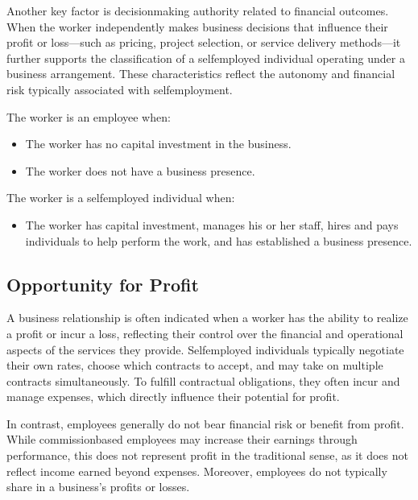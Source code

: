 \documentclass[letterpaper,10pt,english]{sphinxmanual}
\begin{document}
\sphinxAtStartPar
Another key factor is decision\sphinxhyphen{}making authority related to financial outcomes. When the worker independently makes business
decisions that influence their profit or loss—such as pricing, project selection, or service delivery methods—it further
supports the classification of a self\sphinxhyphen{}employed individual operating under a business arrangement. These characteristics
reflect the autonomy and financial risk typically associated with self\sphinxhyphen{}employment.

\sphinxAtStartPar
The worker is an employee when:
\begin{itemize}
\item {} 
\sphinxAtStartPar
The worker has no capital investment in the business.

\item {} 
\sphinxAtStartPar
The worker does not have a business presence.

\end{itemize}

\sphinxAtStartPar
The worker is a self\sphinxhyphen{}employed individual when:
\begin{itemize}
\item {} 
\sphinxAtStartPar
The worker has capital investment, manages his or her staff, hires and pays individuals to help perform the work, and has established a business presence.

\end{itemize}


\subsection{Opportunity for Profit}
\label{\detokenize{compliance:opportunity-for-profit}}
\sphinxAtStartPar
A business relationship is often indicated when a worker has the ability to realize a profit or incur a loss, reflecting their
control over the financial and operational aspects of the services they provide. Self\sphinxhyphen{}employed individuals typically
negotiate their own rates, choose which contracts to accept, and may take on multiple contracts simultaneously. To fulfill
contractual obligations, they often incur and manage expenses, which directly influence their potential for profit.

\sphinxAtStartPar
In contrast, employees generally do not bear financial risk or benefit from profit. While commission\sphinxhyphen{}based employees may
increase their earnings through performance, this does not represent profit in the traditional sense, as it does not reflect
income earned beyond expenses. Moreover, employees do not typically share in a business’s profits or losses.
\end{document}
